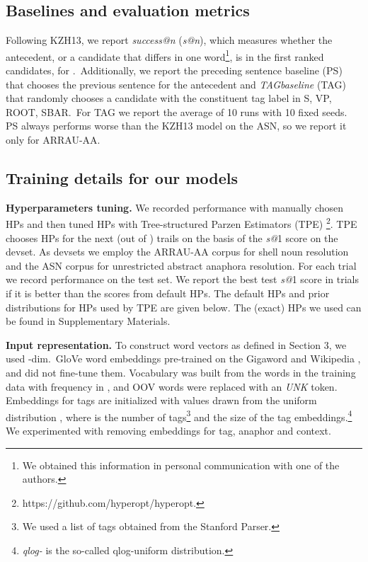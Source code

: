 \documentclass[11pt,letterpaper]{article}
\begin{document}
\subsection{Baselines and evaluation metrics}

Following KZH13, we report {\em success@n} (\textit{s@n}), which measures whether the antecedent, or a candidate that differs in one word\footnote{We obtained this information in personal communication with one of the authors.}, is in the first  ranked candidates, for .\ Additionally, we report the preceding sentence baseline (PS) that chooses the previous sentence for the antecedent and {\em TAGbaseline} (TAG) that randomly chooses a candidate with the constituent tag label in S, VP, ROOT, SBAR.\ For TAG
we report the average of 10 runs with 10 fixed seeds. PS always performs worse than the KZH13 model on the ASN, so we report it only for ARRAU-AA.



\subsection{Training details for our models}

\textbf{Hyperparameters tuning.} We recorded performance with manually chosen HPs and then tuned HPs with Tree-structured Parzen Estimators (TPE) \cite{Bergstra2011AlgorithmsFH}\footnote{https://github.com/hyperopt/hyperopt.}. TPE chooses HPs for the next (out of ) trails on the basis of the {\em s@}1 score on the devset.
As devsets we employ the ARRAU-AA corpus for shell noun resolution and the ASN corpus for unrestricted abstract anaphora resolution. For each trial we record performance on the test set. We report the best test {\em s@}1 score in  trials if it is better than the scores from default HPs. The default HPs and prior distributions for HPs used by TPE are given below. The (exact) HPs we used can be found in Supplementary Materials.  

\textbf{Input representation.} To construct word vectors  as defined in Section 3, we used -dim.\ GloVe word embeddings pre-trained on the Gigaword and Wikipedia \cite{pennington2014glove}, and did not fine-tune them. Vocabulary was built from the words in the training data with frequency in , and OOV words were replaced with an \textit{UNK} token. Embeddings for tags are initialized with values drawn from the uniform distribution , where  is the number of tags\footnote{We used a list of tags obtained from the Stanford Parser.} and  the size of the tag embeddings.\footnote{\textit{qlog-} is the so-called qlog-uniform distribution.} We experimented with removing embeddings for tag, anaphor and context. 
\end{document}
